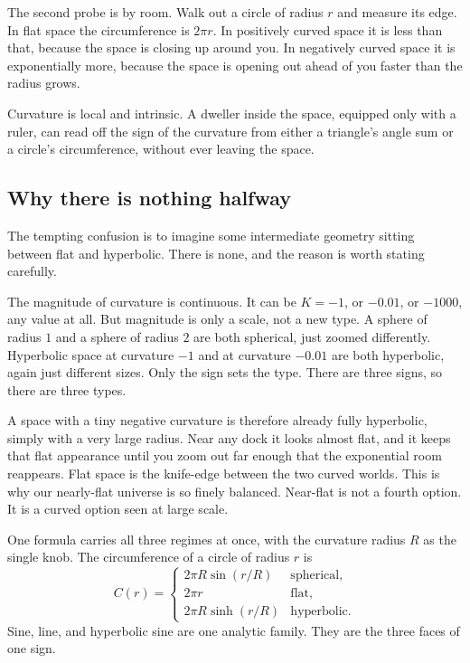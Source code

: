 The second probe is by room. Walk out a circle of radius $r$ and measure its edge. In flat space the circumference is $2\pi r$. In positively curved space it is less than that, because the space is closing up around you. In negatively curved space it is exponentially more, because the space is opening out ahead of you faster than the radius grows.

\begin{principle}
Curvature is local and intrinsic. A dweller inside the space, equipped only with a ruler, can read off the sign
of the curvature from either a triangle's angle sum or a circle's circumference, without ever leaving the space.
\end{principle}

\subsection{Why there is nothing halfway}

The tempting confusion is to imagine some intermediate geometry sitting between flat and hyperbolic. There is none, and the reason is worth stating carefully.

The magnitude of curvature is continuous. It can be $K = -1$, or $-0.01$, or $-1000$, any value at all. But magnitude is only a scale, not a new type. A sphere of radius $1$ and a sphere of radius $2$ are both spherical, just zoomed differently. Hyperbolic space at curvature $-1$ and at curvature $-0.01$ are both hyperbolic, again just different sizes. Only the sign sets the type. There are three signs, so there are three types.

A space with a tiny negative curvature is therefore already fully hyperbolic, simply with a very large radius. Near any dock it looks almost flat, and it keeps that flat appearance until you zoom out far enough that the exponential room reappears. Flat space is the knife-edge between the two curved worlds. This is why our nearly-flat universe is so finely balanced. Near-flat is not a fourth option. It is a curved option seen at large scale.

One formula carries all three regimes at once, with the curvature radius $R$ as the single knob. The circumference of a circle of radius $r$ is
\[
C(r) = \begin{cases}
2\pi R \sin(r/R) & \text{spherical},\\
2\pi r & \text{flat},\\
2\pi R \sinh(r/R) & \text{hyperbolic}.
\end{cases}
\]
Sine, line, and hyperbolic sine are one analytic family. They are the three faces of one sign.

